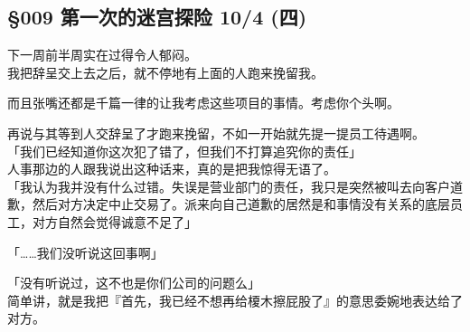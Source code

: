 \subsection{§009 第一次的迷宫探险 10/4 (四)}

下一周前半周实在过得令人郁闷。\\

我把辞呈交上去之后，就不停地有上面的人跑来挽留我。

而且张嘴还都是千篇一律的让我考虑这些项目的事情。考虑你个头啊。

再说与其等到人交辞呈了才跑来挽留，不如一开始就先提一提员工待遇啊。\\

「我们已经知道你这次犯了错了，但我们不打算追究你的责任」\\

人事那边的人跟我说出这种话来，真的是把我惊得无语了。\\

「我认为我并没有什么过错。失误是营业部门的责任，我只是突然被叫去向客户道歉，然后对方决定中止交易了。派来向自己道歉的居然是和事情没有关系的底层员工，对方自然会觉得诚意不足了」

「……我们没听说这回事啊」

「没有听说过，这不也是你们公司的问题么」\\

简单讲，就是我把『首先，我已经不想再给榎木擦屁股了』的意思委婉地表达给了对方。\\


